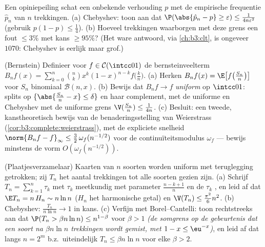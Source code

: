 \begin{exercise}[$\star\star$]\label{exo:b3:probability:7}
Een opiniepeiling schat een onbekende verhouding $p$ met de
empirische frequentie $\hat p_n$ van $n$ 
trekkingen.
(a) Chebyshev: toon aan dat $\P(\abs{\hat p_n - p} \geq
\varepsilon) \leq \frac1{4n\varepsilon^2}$ (gebruik $p(1-p) \leq
\frac14$).
(b) Hoeveel trekkingen waarborgen met deze grens een fout $\leq
3\%$ met kans $\geq 95\%$? (Het ware antwoord, via
\cref{ch:b3:clt}, is ongeveer $1070$: Chebyshev is eerlijk maar
grof.)
\end{exercise}

\begin{exercise}[$\star\star\star$]\label{exo:b3:probability:8}
(Bernstein) Definieer voor $f \in \mathcal C(\intcc01)$ de
bernsteinveelterm $B_nf(x) =
\sum_{k=0}^n\binom nkx^k(1-x)^{n-k}f\bigl(\frac kn\bigr)$.
(a) Herken $B_nf(x) = \E\bigl[f\bigl(\frac {S_n}n\bigr)\bigr]$
voor $S_n$ binomiaal $\mathcal B(n, x)$.
(b) Bewijs dat $B_nf \to f$ \emph{uniform} op $\intcc01$: splits
op $\{\abs{\frac{S_n}n - x} \leq \delta\}$ en haar complement,
met de uniforme  en Chebyshev met de uniforme grens
$\V(\frac{S_n}n) \leq \frac1{4n}$.
(c) Besluit: een tweede, kanstheoretisch bewijs van de
benaderingsstelling van Weierstrass
(\cref{cor:b3:complete:weierstrass}), met de expliciete snelheid
$\norm{B_nf - f}_\infty \leq \frac32\,\omega_f(n^{-1/2})$ voor de
continuïteitsmodulus $\omega_f$ --- bewijs minstens de vorm
$O(\omega_f(n^{-1/2}))$.
\end{exercise}

\begin{exercise}[$\star\star\star$]\label{exo:b3:probability:9}
(Plaatjesverzamelaar) Kaarten van $n$ soorten worden uniform met
teruglegging getrokken; zij $T_n$ het aantal trekkingen tot alle
soorten gezien zijn.
(a) Schrijf $T_n = \sum_{k=1}^{n}\tau_k$ met $\tau_k$ meetkundig
met parameter $\frac{n - k + 1}n$ en de $\tau_k$ ,
en leid af dat $\E T_n = n\,H_n \sim n\ln n$ ($H_n$ het
harmonische getal) en $\V(T_n) \leq \frac{\pi^2}6n^2$.
(b) Chebyshev: $\frac{T_n}{n\ln n} \to 1$ in kans.
(c) Verfijn met Borel--Cantelli: toon rechtstreeks aan dat $\P(T_n
> \beta n\ln n) \leq n^{1 - \beta}$ voor $\beta > 1$ \emph{(de
somgrens op de gebeurtenis dat een soort na $\beta n\ln n$
trekkingen wordt gemist, met $1 - x \leq \eu^{-x}$)}, en leid af
dat langs $n = 2^m$ b.z.\ uiteindelijk $T_n \leq \beta n\ln n$
voor elke $\beta > 2$.
\end{exercise}

